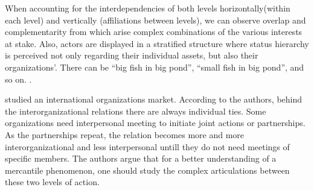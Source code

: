 \documentclass[a4paper, 12pt, openright, oneside, german, french, brazil, english]{abntex2}
\begin{document}
        When accounting for the interdependencies of both levels horizontally(within each level) and vertically (affiliations between levels), we can observe overlap and complementarity from which arise complex combinations of the various interests at stake. Also, actors are displayed in a stratified structure where status hierarchy is perceived not only regarding their individual assets, but also their organizations'. There can be ``big fish in big pond'', ``small fish in big pond'', and so on. \cite{lazega2008catching}.

                
	
	 studied an international organizations market. According to the authors, behind the interorganizational relations there are always individual ties. Some organizations need interpersonal meeting to initiate joint actions or partnerships. As the partnerships repeat, the relation becomes more and more interorganizational and less interpersonal untill they do not need meetings of specific members. The authors argue that for a better understanding of a mercantile phenomenon, one should study the complex articulations between these two levels of action.
	
	
\end{document}
